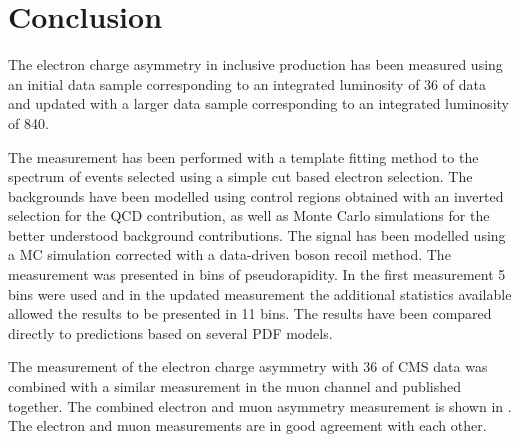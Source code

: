\chapter{Conclusion}
\label{chap:conclusion}

The electron charge asymmetry in inclusive \PW production has been measured
using an initial data sample corresponding to an integrated luminosity of
\unit{36}{\invpb} of data and updated with a larger data sample corresponding to
an integrated luminosity of \unit{840}{\invpb}.

The measurement has been performed with a template fitting method to the \ETm
spectrum of events selected using a simple cut based electron selection.
The backgrounds have been modelled using control regions obtained with an
inverted selection for the QCD contribution, as well as Monte Carlo simulations
for the better understood background contributions.
The signal has been modelled using a MC simulation corrected with a data-driven
boson recoil method.
The measurement was presented in bins of pseudorapidity. In the first
measurement 5 bins were used and in the updated measurement the additional
statistics available allowed the results to be presented in 11 bins.
The results have been compared directly to predictions based on several PDF
models. 

The measurement of the electron charge asymmetry with
\unit{36}{\invpb} of CMS data\cite{baisini2010electron} was combined with a
similar measurement in the muon channel\cite{majumder2010muon} and published
together\cite{asym36}.  The combined electron and muon asymmetry measurement is
shown in . The electron and muon measurements are in
good agreement with each other.

